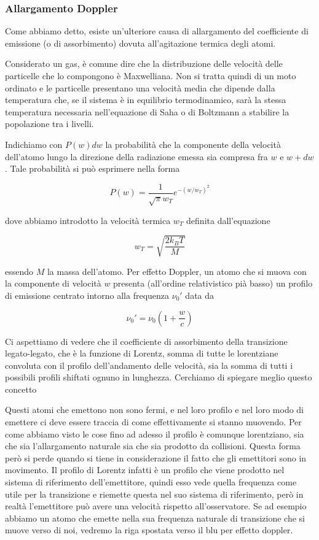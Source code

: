 \subsubsection{Allargamento Doppler}

Come abbiamo detto, esiste un'ulteriore causa di allargamento del coefficiente di emissione (o di assorbimento) dovuta all'agitazione termica degli atomi.

Considerato un gas, è comune dire che la distribuzione delle velocità delle particelle che lo compongono è Maxwelliana. Non si tratta quindi di un moto ordinato e le particelle presentano una velocità media che dipende dalla temperatura che, se il sistema è in equilibrio termodinamico, sarà la stessa temperatura necessaria nell'equazione di Saha o di Boltzmann a stabilire la popolazione tra i livelli. 

Indichiamo con $P(w) dw$ la probabilità che la componente della velocità dell'atomo lungo la direzione della radiazione emessa sia compresa fra $w$ e $w + dw$. Tale probabilità si può esprimere nella forma

\begin{equation*}
  P(w)=\frac{1}{\sqrt{\pi} w_T} e^{-(w/w_T)^2}
\end{equation*}

dove abbiamo introdotto la velocità termica $w_T$ definita dall'equazione

\begin{equation*}
  w_T=\sqrt{\frac{2 k_B T}{M}}
\end{equation*}

essendo $M$ la massa dell'atomo. Per effetto Doppler, un atomo che si muova con la componente di velocità $w$ presenta (all'ordine relativistico pià basso) un profilo di emissione centrato intorno alla frequenza $\nu_0'$ data da

\begin{equation*}
  \nu_0'=\nu_0 \left( 1 + \frac{w}{c} \right)
\end{equation*}

Ci aspettiamo di vedere che il coefficiente di assorbimento della transizione legato-legato, che è la funzione di Lorentz, somma di tutte le lorentziane convoluta con il profilo dell'andamento delle velocità, sia la somma di tutti i possibili profili shiftati ognuno in lunghezza. Cerchiamo di spiegare meglio questo concetto

Questi atomi che emettono non sono fermi, e nel loro profilo e nel loro modo di emettere ci deve essere traccia di come effettivamente si stanno muovendo. Per come abbiamo visto le cose fino ad adesso il profilo è comunque lorentziano, sia che sia l'allargamento naturale sia che sia prodotto da collisioni. Questa forma però si perde quando si tiene in considerazione il fatto che gli emettitori sono in movimento. Il profilo di Lorentz infatti è un profilo che viene prodotto nel sistema di riferimento dell'emettitore, quindi esso vede quella frequenza come utile per la transizione e riemette questa nel suo sistema di riferimento, però in realtà l'emettitore può avere una velocità rispetto all'osservatore. Se ad esempio abbiamo un atomo che emette nella sua frequenza naturale di transizione che si muove verso di noi, vedremo la riga spostata verso il blu per effetto doppler.


